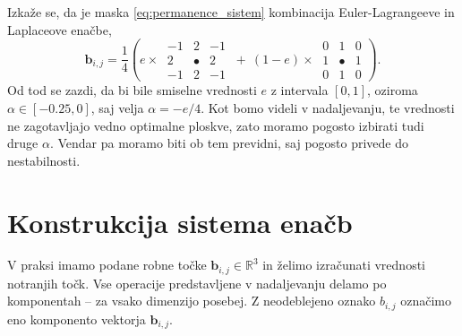 \documentclass[twocolumn, 10pt]{article}    %
\begin{document}
Izkaže se, da je maska \ref{eq:permanence_sistem} kombinacija Euler-Lagrangeeve in Laplaceove enačbe,
\begin{equation}
    \mathbf{b}_{i,j} = \frac{1}{4} \left( e \times \ \begin{matrix}
            -1 & 2 & -1 \\ 2 & \bullet & 2 \\ -1 & 2 & -1
        \end{matrix}
        \ +  \ (1-e) \times \ \begin{matrix}
            0 & 1 & 0 \\ 1 & \bullet & 1 \\ 0 & 1 & 0
        \end{matrix}
        \right).
\end{equation}
Od tod se zazdi, da bi bile smiselne vrednosti $e$ z intervala $[0,1]$, oziroma $\alpha \in [-0.25, 0]$, saj velja $\alpha = -e/4$.
Kot bomo videli v nadaljevanju, te vrednosti ne zagotavljajo vedno optimalne ploskve, zato moramo pogosto izbirati tudi druge $\alpha$. 
Vendar pa moramo biti ob tem previdni, saj pogosto privede do nestabilnosti.

\section{Konstrukcija sistema enačb}
V praksi imamo podane robne točke $\mathbf{b}_{i,j} \in \mathbb{R}^3$ in želimo izračunati vrednosti notranjih točk. Vse operacije predstavljene v nadaljevanju delamo po komponentah -- za vsako dimenzijo posebej. Z neodeblejeno oznako $b_{i,j}$ označimo eno komponento vektorja $\mathbf{b}_{i,j}$.
\end{document}

